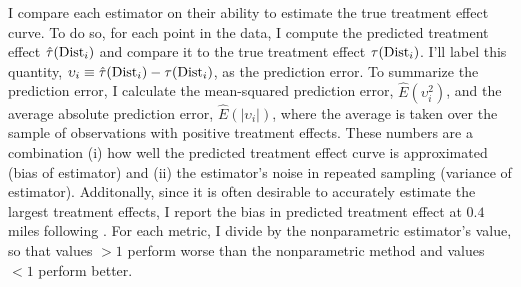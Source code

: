 I compare each estimator on their ability to estimate the true treatment effect curve. To do so, for each point in the data, I compute the predicted treatment effect $\hat{\tau}(\text{Dist}_i)$ and compare it to the true treatment effect $\tau(\text{Dist}_i)$. I'll label this quantity, $\upsilon_i \equiv \hat{\tau}(\text{Dist}_i) - \tau(\text{Dist}_i)$, as the prediction error. To summarize the prediction error, I calculate the mean-squared prediction error, $\hat{E}(\upsilon_i^2)$, and the average absolute prediction error, $\hat{E}( | \upsilon_i |)$, where the average is taken over the sample of observations with positive treatment effects. These numbers are a combination (i) how well the predicted treatment effect curve is approximated (bias of estimator) and (ii) the estimator's noise in repeated sampling (variance of estimator). Additonally, since it is often desirable to accurately estimate the largest treatment effects, I report the bias in predicted treatment effect at $0.4$ miles following \cite{diamond2019wants}. For each metric, I divide by the nonparametric estimator's value, so that values $> 1$ perform worse than the nonparametric method and values $< 1$ perform better.

